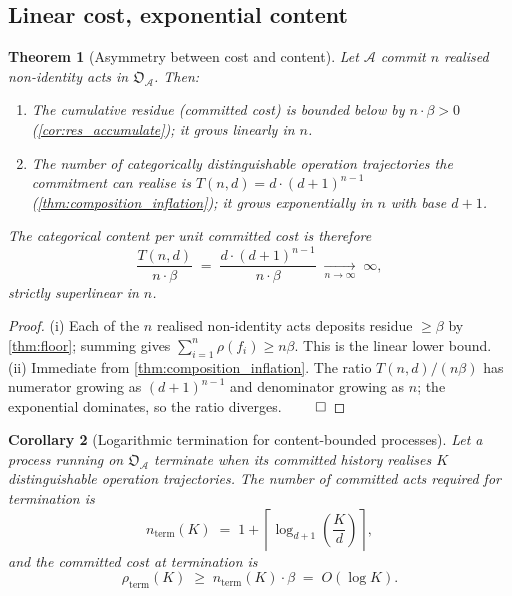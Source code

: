 \documentclass[11pt,twocolumn,a4paper]{article}
\theoremstyle{thmstyle}
\newtheorem{theorem}{Theorem}[section]
\newtheorem{corollary}[theorem]{Corollary}
\theoremstyle{definition}
\theoremstyle{remark}
\newcommand{\Agent}{\mathcal{A}}
\newcommand{\floor}{\beta}
\newcommand{\OpStr}{\mathfrak{O}}
\begin{document}
\subsection{Linear cost, exponential content}

\begin{theorem}[Asymmetry between cost and content]
\label{thm:cost_content_asymmetry}
Let $\Agent$ commit $n$ realised non-identity acts in $\OpStr_\Agent$.
Then:
\begin{enumerate}[label=\textup{(\roman*)},nosep,leftmargin=2.4em]
\item The cumulative residue (committed cost) is bounded below by
$n \cdot \floor > 0$ (\cref{cor:res_accumulate}); it grows
\emph{linearly} in $n$.
\item The number of categorically distinguishable operation
trajectories the commitment can realise is $T(n, d)
= d \cdot (d + 1)^{n - 1}$ (\cref{thm:composition_inflation});
it grows \emph{exponentially} in $n$ with base $d + 1$.
\end{enumerate}
The categorical content per unit committed cost is therefore
\[
  \frac{T(n, d)}{n \cdot \floor}
  \;=\; \frac{d \cdot (d + 1)^{n - 1}}{n \cdot \floor}
  \;\xrightarrow[n \to \infty]{}\; \infty,
\]
strictly superlinear in $n$.
\end{theorem}

\begin{proof}
(i) Each of the $n$ realised non-identity acts deposits residue
$\geq \floor$ by \cref{thm:floor}; summing gives $\sum_{i=1}^{n}
\rho(f_i) \geq n \floor$. This is the linear lower bound.
(ii) Immediate from \cref{thm:composition_inflation}.
The ratio $T(n, d) / (n \floor)$ has numerator growing as
$(d+1)^{n-1}$ and denominator growing as $n$; the exponential
dominates, so the ratio diverges. $\qed$
\end{proof}

\begin{corollary}[Logarithmic termination for content-bounded
processes]
\label{cor:log_termination}
Let a process running on $\OpStr_\Agent$ terminate when its
committed history realises $K$ distinguishable operation
trajectories. The number of committed acts required for
termination is
\[
  n_{\mathrm{term}}(K)
  \;=\; 1 + \left\lceil
    \log_{d+1}\!\left(\frac{K}{d}\right)
  \right\rceil,
\]
and the committed cost at termination is
\[
  \rho_{\mathrm{term}}(K)
  \;\geq\; n_{\mathrm{term}}(K) \cdot \floor
  \;=\; O(\log K).
\]
\end{corollary}
\end{document}
